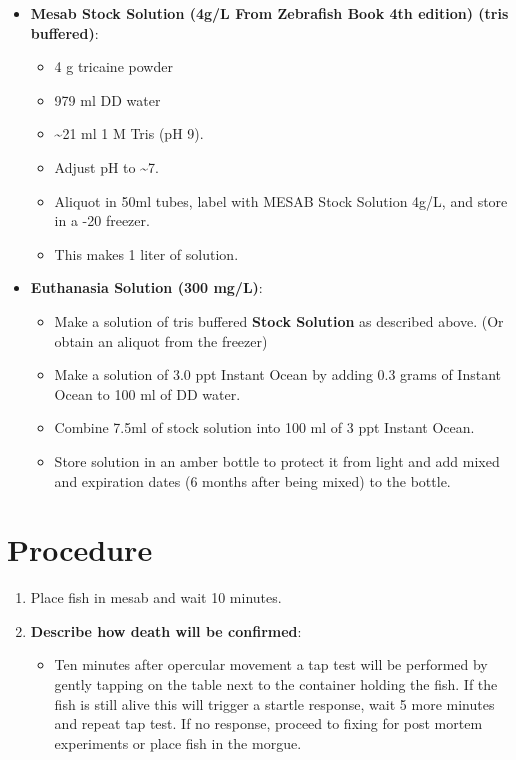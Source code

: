 \documentclass[
  letterpaper,
  DIV=11,
  numbers=noendperiod]{scrreprt}
\providecommand{\tightlist}{%
  \setlength{\itemsep}{0pt}\setlength{\parskip}{0pt}}\usepackage{longtable,booktabs,array}
\begin{document}
\begin{itemize}
\item
  \textbf{Mesab Stock Solution (4g/L From Zebrafish Book 4th edition)
  (tris buffered)}:

  \begin{itemize}
  \tightlist
  \item
    4 g tricaine powder
  \item
    979 ml DD water
  \item
    \textasciitilde21 ml 1 M Tris (pH 9).
  \item
    Adjust pH to \textasciitilde7.
  \item
    Aliquot in 50ml tubes, label with MESAB Stock Solution 4g/L, and
    store in a -20 freezer.
  \item
    This makes 1 liter of solution.
  \end{itemize}
\item
  \textbf{Euthanasia Solution (300 mg/L)}:

  \begin{itemize}
  \tightlist
  \item
    Make a solution of tris buffered \textbf{Stock Solution} as
    described above. (Or obtain an aliquot from the freezer)
  \item
    Make a solution of 3.0 ppt Instant Ocean by adding 0.3 grams of
    Instant Ocean to 100 ml of DD water.
  \item
    Combine 7.5ml of stock solution into 100 ml of 3 ppt Instant Ocean.
  \item
    Store solution in an amber bottle to protect it from light and add
    mixed and expiration dates (6 months after being mixed) to the
    bottle.
  \end{itemize}
\end{itemize}

\hypertarget{procedure-37}{%
\section{Procedure}\label{procedure-37}}

\begin{enumerate}
\def\labelenumi{\arabic{enumi}.}
\tightlist
\item
  Place fish in mesab and wait 10 minutes.
\item
  \textbf{Describe how death will be confirmed}:

  \begin{itemize}
  \tightlist
  \item
    Ten minutes after opercular movement a tap test will be performed by
    gently tapping on the table next to the container holding the fish.
    If the fish is still alive this will trigger a startle response,
    wait 5 more minutes and repeat tap test. If no response, proceed to
    fixing for post mortem experiments or place fish in the morgue.
  \end{itemize}
\end{enumerate}
\end{document}
